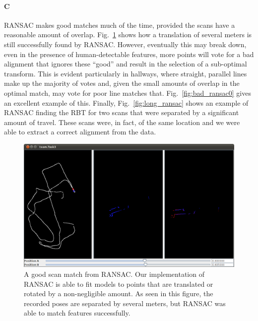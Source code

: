 \documentclass[12pt]{article}
\begin{document}
\paragraph{C}
RANSAC makes good matches much of the time, provided the scans have a reasonable
amount of overlap. Fig.~\ref{fig:good_ransac0} shows how a translation of several
meters is still successfully found by RANSAC. However, eventually this may break
down, even in the presence of human-detectable features, more points will vote
for a bad alignment that ignores these ``good'' and result in the selection of
a sub-optimal transform. This is evident particularly in hallways, where straight,
parallel lines make up the majority of votes and, given the small amounts of overlap in
the optimal match, may vote for poor line matches that. Fig.~\ref{fig:bad_ransac0} gives
an excellent example of this. Finally, Fig.~\ref{fig:long_ransac} shows an example of
RANSAC finding the RBT for two scans that were separated by a significant amount
of travel. These scans were, in fact, of the same location and we were able to extract
a correct alignment from the data.

\begin{figure}[h!]
\centering
\includegraphics[width=.7\textwidth]{figures/Task3_good0.png}
\caption{A good scan match from RANSAC. Our implementation of RANSAC is able
to fit models to points that are translated or rotated by a non-negligible amount. As seen
in this figure, the recorded poses are separated by several meters, but RANSAC
was able to match features successfully.}
\label{fig:good_ransac0}
\end{figure}
\end{document}
